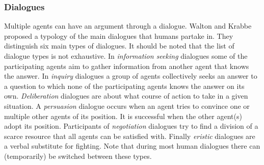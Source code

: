 \subsubsection{Dialogues}
Multiple agents can have an argument through a dialogue. Walton and
Krabbe \cite{walton1995} proposed a typology of the main dialogues that humans
partake in. They distinguish six main types of dialogues. It should be noted
that the list of dialogue types is not exhaustive. In \emph{information
seeking} dialogues some of the participating agents aim to gather information
from another agent that knows the answer. In \emph{inquiry} dialogues a group of
agents collectively seeks an answer to a question to which none of the
participating agents knows the answer on its own. \emph{Deliberation} dialogues
are about what course of action to take in a given situation. A
\emph{persuasion} dialogue occurs when an agent tries to convince one or
multiple other agents of its position. It is successful when the other agent(s)
adopt its position. Participants of \emph{negotiation} dialogues try to find a
division of a scarce resource that all agents can be satisfied with. Finally
\emph{eristic} dialogues are a verbal substitute for fighting. Note that during
most human dialogues there can (temporarily) be switched between these types.

